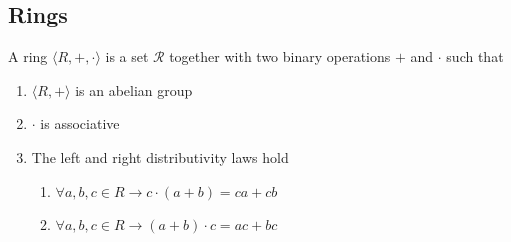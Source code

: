 \documentclass[../notes.tex]{subfiles}
\begin{document}

\subsection{Rings}

\begin{definition}[Ring]
    A ring $\langle R, +, \cdot \rangle$ is a set $\mathcal{R}$ together with two binary operations $+$ and $\cdot$ such that 
    \begin{enumerate}
        \item $\langle R, + \rangle$ is an abelian group
        \item $\cdot$ is associative
        \item The left and right distributivity laws hold \begin{enumerate}
            \item $\forall a,b,c \in R \rightarrow c\cdot (a+b) = ca + cb$ 
            \item $\forall a,b,c \in R \rightarrow (a+b)\cdot c = ac + bc$ 
        \end{enumerate}
    \end{enumerate}
\end{definition}
\end{document}
